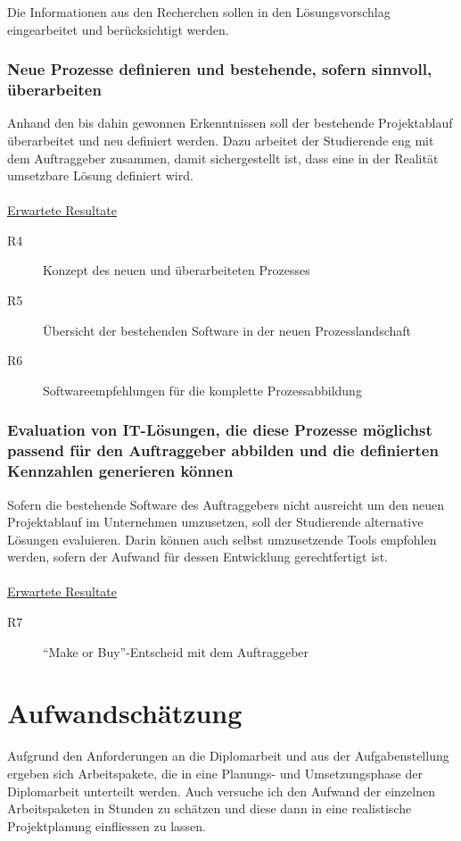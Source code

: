 Die Informationen aus den Recherchen sollen in den Lösungsvorschlag eingearbeitet
und berücksichtigt werden.

\subsubsection{Neue Prozesse definieren und bestehende, sofern sinnvoll, überarbeiten}
Anhand den bis dahin gewonnen Erkenntnissen soll der bestehende Projektablauf
überarbeitet und neu definiert werden. Dazu arbeitet der Studierende eng mit
dem Auftraggeber zusammen, damit sichergestellt ist, dass eine in der Realität
umsetzbare Lösung definiert wird.
\\\\
\underline{Erwartete Resultate}

\begin{description}
    \item[R4] Konzept des neuen und überarbeiteten Prozesses
    \item[R5] Übersicht der bestehenden Software in der neuen Prozesslandschaft
    \item[R6] Softwareempfehlungen für die komplette Prozessabbildung
\end{description}

\subsubsection{Evaluation von IT-Lösungen, die diese Prozesse möglichst passend 
    für den Auftraggeber abbilden und die definierten Kennzahlen generieren können}
Sofern die bestehende Software des Auftraggebers nicht ausreicht um den neuen
Projektablauf im Unternehmen umzusetzen, soll der Studierende alternative 
Lösungen evaluieren. Darin können auch selbst umzusetzende Tools empfohlen 
werden, sofern der Aufwand für dessen Entwicklung gerechtfertigt ist.
\\\\
\underline{Erwartete Resultate}

\begin{description}
    \item[R7] ``Make or Buy''-Entscheid mit dem Auftraggeber
\end{description}

\section{Aufwandschätzung}
Aufgrund den Anforderungen an die Diplomarbeit und aus der Aufgabenstellung
ergeben sich Arbeitspakete, die in eine Planungs- und Umsetzungsphase
der Diplomarbeit unterteilt werden. Auch versuche ich den Aufwand der einzelnen
Arbeitspaketen in Stunden zu schätzen und diese dann in eine realistische 
Projektplanung einfliessen zu lassen.

